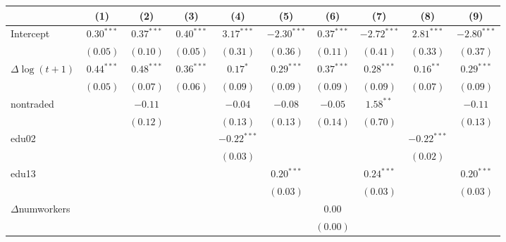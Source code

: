 
\begin{tabular}{l c c c c c c c c c }
\hline
                      & (1) & (2) & (3) & (4) & (5) & (6) & (7) & (8) & (9) \\
\hline
Intercept             & $0.30^{***}$ & $0.37^{***}$ & $0.40^{***}$ & $3.17^{***}$  & $-2.30^{***}$ & $0.37^{***}$ & $-2.72^{***}$ & $2.81^{***}$  & $-2.80^{***}$ \\
                      & $(0.05)$     & $(0.10)$     & $(0.05)$     & $(0.31)$      & $(0.36)$      & $(0.11)$     & $(0.41)$      & $(0.33)$      & $(0.37)$      \\
$\Delta\log(t+1)$     & $0.44^{***}$ & $0.48^{***}$ & $0.36^{***}$ & $0.17^{*}$    & $0.29^{***}$  & $0.37^{***}$ & $0.28^{***}$  & $0.16^{**}$   & $0.29^{***}$  \\
                      & $(0.05)$     & $(0.07)$     & $(0.06)$     & $(0.09)$      & $(0.09)$      & $(0.09)$     & $(0.09)$      & $(0.07)$      & $(0.09)$      \\
nontraded             &              & $-0.11$      &              & $-0.04$       & $-0.08$       & $-0.05$      & $1.58^{**}$   &               & $-0.11$       \\
                      &              & $(0.12)$     &              & $(0.13)$      & $(0.13)$      & $(0.14)$     & $(0.70)$      &               & $(0.13)$      \\
edu02                 &              &              &              & $-0.22^{***}$ &               &              &               & $-0.22^{***}$ &               \\
                      &              &              &              & $(0.03)$      &               &              &               & $(0.02)$      &               \\
edu13                 &              &              &              &               & $0.20^{***}$  &              & $0.24^{***}$  &               & $0.20^{***}$  \\
                      &              &              &              &               & $(0.03)$      &              & $(0.03)$      &               & $(0.03)$      \\
$\Delta$numworkers    &              &              &              &               &               & $0.00$       &               &               &               \\
                      &              &              &              &               &               & $(0.00)$     &               &               &               \\

\end{tabular}
